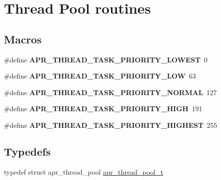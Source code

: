 \hypertarget{group___a_p_r___util___t_p}{\section{Thread Pool routines}
\label{group___a_p_r___util___t_p}
}
\subsection*{Macros}
\begin{DoxyCompactItemize}
\item 
\hypertarget{group___a_p_r___util___t_p_ga312691aaa41f45820e13c2566a4c6780}{\#define {\bfseries A\-P\-R\-\_\-\-T\-H\-R\-E\-A\-D\-\_\-\-T\-A\-S\-K\-\_\-\-P\-R\-I\-O\-R\-I\-T\-Y\-\_\-\-L\-O\-W\-E\-S\-T}~0}\label{group___a_p_r___util___t_p_ga312691aaa41f45820e13c2566a4c6780}

\item 
\hypertarget{group___a_p_r___util___t_p_ga19879c994e9a71e9954e580a179b62c1}{\#define {\bfseries A\-P\-R\-\_\-\-T\-H\-R\-E\-A\-D\-\_\-\-T\-A\-S\-K\-\_\-\-P\-R\-I\-O\-R\-I\-T\-Y\-\_\-\-L\-O\-W}~63}\label{group___a_p_r___util___t_p_ga19879c994e9a71e9954e580a179b62c1}

\item 
\hypertarget{group___a_p_r___util___t_p_ga84d2ac8fa8a538661715b0d2e2736cb1}{\#define {\bfseries A\-P\-R\-\_\-\-T\-H\-R\-E\-A\-D\-\_\-\-T\-A\-S\-K\-\_\-\-P\-R\-I\-O\-R\-I\-T\-Y\-\_\-\-N\-O\-R\-M\-A\-L}~127}\label{group___a_p_r___util___t_p_ga84d2ac8fa8a538661715b0d2e2736cb1}

\item 
\hypertarget{group___a_p_r___util___t_p_ga289d5e1346b5807b43db9ea7d4ea5c17}{\#define {\bfseries A\-P\-R\-\_\-\-T\-H\-R\-E\-A\-D\-\_\-\-T\-A\-S\-K\-\_\-\-P\-R\-I\-O\-R\-I\-T\-Y\-\_\-\-H\-I\-G\-H}~191}\label{group___a_p_r___util___t_p_ga289d5e1346b5807b43db9ea7d4ea5c17}

\item 
\hypertarget{group___a_p_r___util___t_p_ga5fa01e4e210270d119382a80aae13d1d}{\#define {\bfseries A\-P\-R\-\_\-\-T\-H\-R\-E\-A\-D\-\_\-\-T\-A\-S\-K\-\_\-\-P\-R\-I\-O\-R\-I\-T\-Y\-\_\-\-H\-I\-G\-H\-E\-S\-T}~255}\label{group___a_p_r___util___t_p_ga5fa01e4e210270d119382a80aae13d1d}

\end{DoxyCompactItemize}
\subsection*{Typedefs}
\begin{DoxyCompactItemize}
\item 
typedef struct apr\-\_\-thread\-\_\-pool \hyperlink{group___a_p_r___util___t_p_gab31b68a03a0d5eec3e1879c253d3b620}{apr\-\_\-thread\-\_\-pool\-\_\-t}
\end{DoxyCompactItemize}
